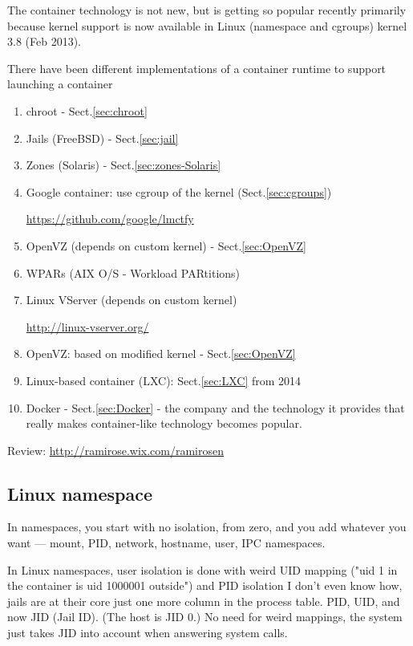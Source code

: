The container technology is not new, but is getting so popular recently
primarily because kernel support is now available in Linux (namespace and
cgroups) kernel 3.8 (Feb 2013).

There have been different implementations of a container runtime to support
launching a container

\begin{enumerate}
  
  \item chroot - Sect.\ref{sec:chroot}
  
  \item Jails (FreeBSD) - Sect.\ref{sec:jail}
  \item Zones (Solaris) - Sect.\ref{sec:zones-Solaris}
  
  \item Google container: use cgroup of the kernel (Sect.\ref{sec:cgroups})
  
  \url{https://github.com/google/lmctfy}

  \item OpenVZ (depends on custom kernel) - Sect.\ref{sec:OpenVZ}
  \item WPARs (AIX O/S - Workload PARtitions)
  
  \item Linux VServer (depends on custom kernel)
  
  \url{http://linux-vserver.org/}
  
  
  \item OpenVZ: based on modified kernel - Sect.\ref{sec:OpenVZ}
  
  
  \item Linux-based container (LXC): Sect.\ref{sec:LXC} from 2014
  
  \item Docker - Sect.\ref{sec:Docker} - the company and the technology it provides that really makes
  container-like technology becomes popular.
\end{enumerate}

Review: \url{http://ramirose.wix.com/ramirosen} 


\subsection{Linux namespace}

In namespaces, you start with no isolation, from zero, and you add whatever you
want — mount, PID, network, hostname, user, IPC namespaces.


In Linux namespaces,  user isolation is done with weird UID mapping ("uid
1 in the container is uid 1000001 outside") and PID isolation I don't even know
how, jails are at their core just one more column in the process table. PID,
UID, and now JID (Jail ID). (The host is JID 0.) No need for weird mappings, the
system just takes JID into account when answering system calls.



